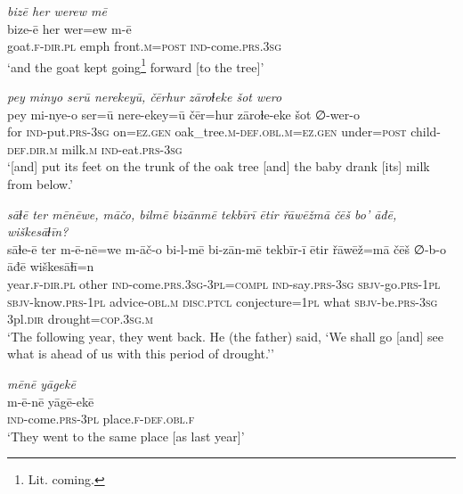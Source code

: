 \ea \label{ZB.44}
\textit{bizē her werew mē} \\ 
\gll bize-ē her wer=ew m-ē \\ 
 goat\textsc{.f}\textsc{-dir}\textsc{.pl} emph front\textsc{.m}\textsc{=\textsc{post}} \textsc{ind-}come\textsc{.prs}\textsc{.3sg} \\ 
\glt `and the goat kept going\footnote{Lit. coming.} forward [to the tree]'
\z 
 
\ea \label{ZB.45}
\textit{pey minyo serū nerekeyū, čērhur zāroɫeke šot wero} \\ 
\gll pey mi-nye-o ser=ū nere-ekey=ū čēr=hur zāroɫe-eke šot ∅-wer-o \\ 
 for \textsc{ind-}put\textsc{.prs}\textsc{-3sg} on\textsc{\textsc{=ez.gen}} oak\_tree\textsc{.m}\textsc{-def}\textsc{.obl}\textsc{.m}\textsc{\textsc{=ez.gen}} under\textsc{=\textsc{post}} child\textsc{-def}\textsc{.dir}\textsc{.m} milk\textsc{.m} \textsc{ind-}eat\textsc{.prs}\textsc{-3sg} \\ 
\glt `[and] put its feet on the trunk of the oak tree [and] the baby drank [its] milk from below.'
\z 
 
\ea \label{ZB.46}
\textit{sāɫē ter mēnēwe, māčo, bilmē bizānmē tekbīrī ētir řāwēžmā čēš bo’ āđē, wiškesāɫīn?} \\ 
\gll sāɫe-ē ter m-ē-nē=we m-āč-o bi-l-mē bi-zān-mē tekbīr-ī ētir řāwēž=mā čēš ∅-b-o āđē wiškesāɫī=n \\ 
 year\textsc{.f}\textsc{-dir}\textsc{.pl} other \textsc{ind-}come\textsc{.prs}\textsc{.3sg}\textsc{-3pl}\textsc{=compl} \textsc{ind-}say\textsc{.prs}\textsc{-3sg} \textsc{sbjv-}go\textsc{.prs}\textsc{-1pl} \textsc{sbjv-}know\textsc{.prs}\textsc{-1pl} advice\textsc{-obl}\textsc{.m} \textsc{disc.ptcl} conjecture\textsc{=1pl} what \textsc{sbjv-}be\textsc{.prs}\textsc{-3sg} 3pl\textsc{.dir} drought\textsc{=cop}\textsc{.3sg}\textsc{.m} \\ 
\glt `The following year, they went back. He (the father) said, ‘We shall go [and] see what is ahead of us with this period of drought.’'
\z 
 
\ea \label{ZB.47}
\textit{mēnē yāgekē} \\ 
\gll m-ē-nē yāgē-ekē \\ 
 \textsc{ind-}come\textsc{.prs}\textsc{-3pl} place\textsc{.f}\textsc{-def}\textsc{.obl}\textsc{.f} \\ 
\glt `They went to the same place [as last year]'
\z 
 
